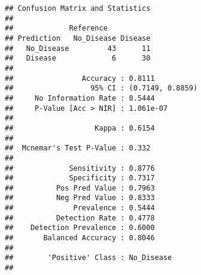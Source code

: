\documentclass[
]{article}
\newenvironment{Shaded}{\begin{snugshade}}{\end{snugshade}}
\newcommand{\AttributeTok}[1]{\textcolor[rgb]{0.13,0.29,0.53}{#1}}
\newcommand{\CommentTok}[1]{\textcolor[rgb]{0.56,0.35,0.01}{\textit{#1}}}
\newcommand{\ConstantTok}[1]{\textcolor[rgb]{0.56,0.35,0.01}{#1}}
\newcommand{\DecValTok}[1]{\textcolor[rgb]{0.00,0.00,0.81}{#1}}
\newcommand{\FunctionTok}[1]{\textcolor[rgb]{0.13,0.29,0.53}{\textbf{#1}}}
\newcommand{\NormalTok}[1]{#1}
\newcommand{\OtherTok}[1]{\textcolor[rgb]{0.56,0.35,0.01}{#1}}
\newcommand{\SpecialCharTok}[1]{\textcolor[rgb]{0.81,0.36,0.00}{\textbf{#1}}}
\newcommand{\StringTok}[1]{\textcolor[rgb]{0.31,0.60,0.02}{#1}}
\begin{document}
\begin{Shaded}
\end{Shaded}

\begin{verbatim}
## Confusion Matrix and Statistics
## 
##             Reference
## Prediction   No_Disease Disease
##   No_Disease         43      11
##   Disease             6      30
##                                           
##                Accuracy : 0.8111          
##                  95% CI : (0.7149, 0.8859)
##     No Information Rate : 0.5444          
##     P-Value [Acc > NIR] : 1.061e-07       
##                                           
##                   Kappa : 0.6154          
##                                           
##  Mcnemar's Test P-Value : 0.332           
##                                           
##             Sensitivity : 0.8776          
##             Specificity : 0.7317          
##          Pos Pred Value : 0.7963          
##          Neg Pred Value : 0.8333          
##              Prevalence : 0.5444          
##          Detection Rate : 0.4778          
##    Detection Prevalence : 0.6000          
##       Balanced Accuracy : 0.8046          
##                                           
##        'Positive' Class : No_Disease      
## 
\end{verbatim}
\end{document}
